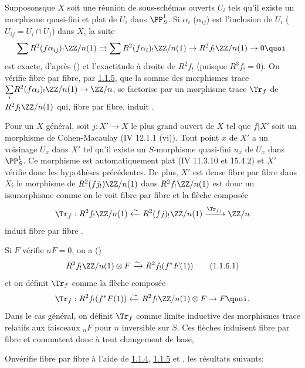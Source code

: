 Supposons\pageoriginale que $X$ soit
une réunion de sous-schémas ouverts $U_{i}$ tels qu'il existe un
morphisme quasi-fini et plat de $U_{i}$ dans $\PP^{1}_S$. Si
$\alpha_{i}$ (\resp $\alpha_{ij}$) est l'inclusion de $U_{i}$ (\resp
$U_{ij}=U_{i}\cap U_{j}$) dans $X$, la suite
$$
\sum R^{2}(f\alpha_{ij})_{!}\ZZ/n(1)\rightrightarrows
\sum R^2(f\alpha_{i})_{!}\ZZ/n(1)\rightarrow
R^{2}f_{!}\ZZ/n(1)\rightarrow 0{\quoi}.
$$
est exacte, d'après () et l'exactitude à droite de
$R^{2}f_{!}$ (puisque $R^{3}f_{!}=0$). On vérifie fibre par fibre, par
\hyperref[XVIII.lem1.1.5]{1.1.5}, que la somme des morphismes trace
$\underset{i}\sum R^{2}(f\alpha_{i})_{!}\ZZ/n(1)\rightarrow
\ZZ/n$, se factorise par un morphisme trace $\Tr_{f}$ de
$R^{2}f_{!}\ZZ/n(1)$ qui, fibre par fibre, induit
.

Pour un $X$ général, soit $j:X'\rightarrow X$ le plus grand ouvert de
$X$ tel que $f|X'$ soit un morphisme de Cohen-Macaulay (\cf \EGA IV
12.1.1 (vi)). Tout point $x$ de $X'$ a un voisinage $U_{x}$ dans $X'$
tel qu'il existe un $S$-morphisme quasi-fini $u_{x}$ de $U_{x}$ dans
$\PP^{1}_{S}$. Ce morphisme est automatiquement plat (\EGA IV
11.3.10 et 15.4.2) et $X'$ vérifie donc les hypothèses précédentes. De
plus, $X'$ est dense fibre par fibre dans $X$; le morphisme de
$R^{2}(fj_{!})\ZZ/n(1)$ dans $R^{2}f_{!}\ZZ/n(1)$ est
donc un isomorphisme comme on le voit fibre par fibre et la flèche
composée
$$
\Tr_{f}:R^{2}f_{!}\ZZ/n(1)\xleftarrow{\sim}
R^{2}(fj)_{!}\ZZ/n(1)\xrightarrow{\Tr_{fj}}\ZZ/n
$$
induit fibre par fibre .

Si $F$ vérifie $nF=0$, on a ()
\begin{equation*}
R^{2}f_{!}\ZZ/n(1)\otimes F\xrightarrow{\sim}
R^{2}f_{!}(f^{\ast}F(1))\tag{1.1.6.1} 
\end{equation*}%
et on définit $\Tr_{f}$ comme la flèche composée
$$
\Tr_{f}:R^{2}f_{!}(f^{\ast}F(1))\xleftarrow{\sim}
R^{2}f_{!}\ZZ/n(1) \otimes F\rightarrow F{\quoi}.
$$
Dans le cas général, on définit $\Tr_{f}$ comme limite inductive des
morphismes trace relatifs aux faisceaux ${}_nF$ pour $n$ inversible
sur $S$. Ces flèches induisent fibre par fibre  et commutent
donc à tout changement de base, \cqfd

On\pageoriginale vérifie fibre par fibre à l'aide de
\hyperref[XVIII.lem1.1.4]{1.1.4}, \hyperref[XVIII.lem1.1.5]{1.1.5} et , les
résultats suivants:


